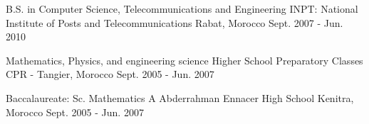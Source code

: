 

\begin{cventries}

  \cventry
    {B.S. in Computer Science, Telecommunications and Engineering} %
    {INPT: National Institute of Posts and Telecommunications} %
    {Rabat, Morocco} %
    {Sept. 2007 - Jun. 2010} %

  \cventry
    {Mathematics, Physics, and engineering science} %
    {Higher School Preparatory Classes} %
    {CPR - Tangier, Morocco} %
    {Sept. 2005 - Jun. 2007} %

  \cventry
    {Baccalaureate: Sc. Mathematics A} %
    {Abderrahman Ennacer High School} %
    {Kenitra, Morocco} %
    {Sept. 2005 - Jun. 2007} %

\end{cventries}
